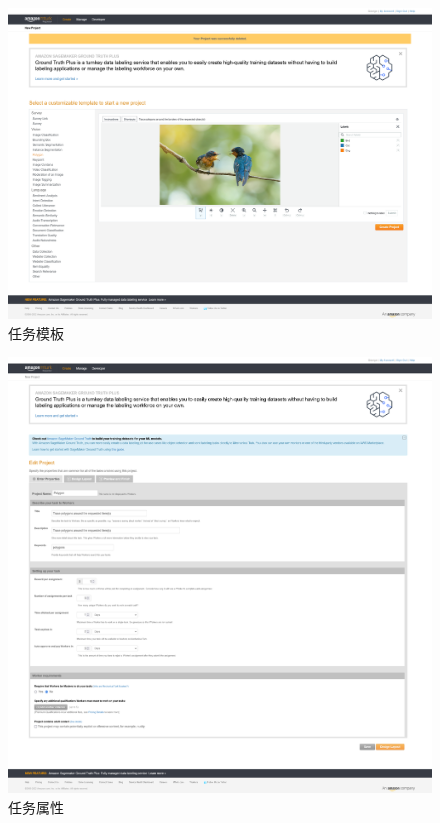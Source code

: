 \begin{figure}[h!]
    \centering
    \includegraphics[width=0.9\linewidth]{imgs/mturk/template.png}
    \caption{任务模板}
    \label{fig:template}
\end{figure}

\newpage

\begin{figure}[h!]
    \centering
    \includegraphics[width=0.9\linewidth]{imgs/mturk/properties.png}
    \caption{任务属性}
    \label{fig:properties}
\end{figure}

\newpage

